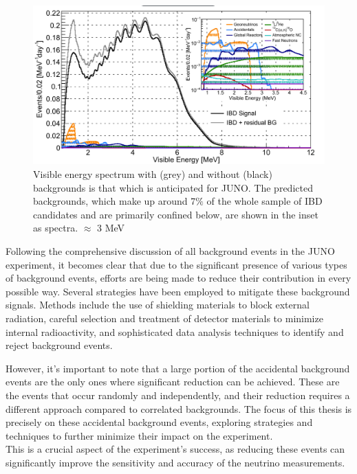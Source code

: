 \begin{figure}[h]
	\centering
	\includegraphics[width=0.7\linewidth]{Images/backgrounds_spectrum}
	\caption{Visible energy spectrum with (grey) and without (black) backgrounds is that which is anticipated for JUNO. The predicted backgrounds, which make up around 7$\%$ of the whole sample of IBD candidates and are primarily confined below, are shown in the inset as spectra. $\approx$ 3 MeV}
	\label{fig:backgroundsspectrum}
\end{figure}


Following the comprehensive discussion of all background events in the JUNO experiment, it becomes clear that due to the significant presence of various types of background events, efforts are being made to reduce their contribution in every possible way. Several strategies have been employed to mitigate these background signals. Methods include the use of shielding materials to block external radiation, careful selection and treatment of detector materials to minimize internal radioactivity, and sophisticated data analysis techniques to identify and reject background events.

However, it's important to note that a large portion of the accidental background events are the only ones where significant reduction can be achieved. These are the events that occur randomly and independently, and their reduction requires a different approach compared to correlated backgrounds. The focus of this thesis is precisely on these accidental background events, exploring strategies and techniques to further minimize their impact on the experiment.\\
This is a crucial aspect of the experiment's success, as reducing these events can significantly improve the sensitivity and accuracy of the neutrino measurements.	 
